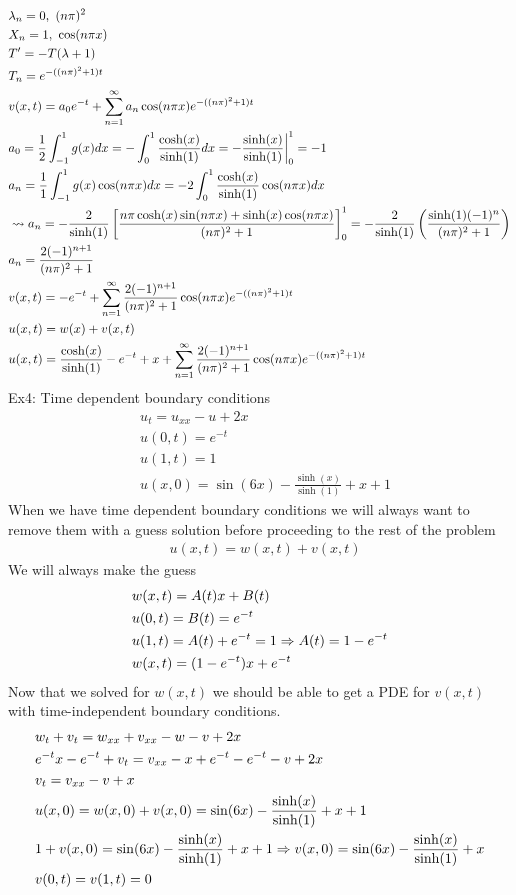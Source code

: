 \documentclass[11pt, fleqn]{article}
\begin{document}
\begin{align*}
    &\lambda_n=0,\ (n\pi)^2\\
    &X_n=1,\ \cos(n\pi x)\\
    &T'=-T(\lambda+1)\\
    &T_n=e^{-((n\pi)^2+1)t}\\
    &v(x,t)=a_0e^{-t}+\sum_{n=1}^\infty a_n\cos(n\pi x)e^{-((n\pi)^2+1)t}\\
    &a_0=\frac{1}{2}\int_{-1}^1g(x)dx=-\int_0^1\frac{\cosh(x)}{\sinh(1)}dx=-{\frac{\sinh(x)}{\sinh(1)}}\bigg\vert_0^1=-1\\
    &a_n=\frac{1}{1}\int_{-1}^1g(x)\cos(n\pi x)dx=-2\int_0^1\frac{\cosh(x)}{\sinh(1)}\cos(n\pi x)dx\\
    &\leadsto a_n=-\frac{2}{\sinh(1)}\left[ \frac{n\pi\cosh(x)\sin(n\pi x)+\sinh(x)\cos(n\pi x)}{(n\pi)^2+1} \right]_0^1=-\frac{2}{\sinh(1)}\left( \frac{\sinh(1)(-1)^n}{(n\pi)^2+1} \right)\\
    &a_n=\frac{2(-1)^{n+1}}{(n\pi)^2+1}\\
    &v(x,t)=-e^{-t}+\sum_{n=1}^\infty\frac{2(-1)^{n+1}}{(n\pi)^2+1}\cos(n\pi x)e^{-((n\pi)^2+1)t}\\
    &u(x,t)=w(x)+v(x,t)\\
    &u(x,t)=\frac{\cosh(x)}{\sinh(1)}-e^{-t}+x+\sum_{n=1}^\infty\frac{2(-1)^{n+1}}{(n\pi)^2+1}\cos(n\pi x)e^{-((n\pi)^2+1)t}
\end{align*}
Ex4: Time dependent boundary conditions
\begin{align*}
    &u_t=u_{xx}-u+2x\\
    &u(0,t)=e^{-t}\\
    &u(1,t)=1\\
    &u(x,0)=\sin(6x)-\frac{\sinh(x)}{\sinh(1)}+x+1
\end{align*}
When we have time dependent boundary conditions we will always want to remove them with a guess solution before proceeding to the rest of the problem
\begin{align*}
    &u(x,t)=w(x,t)+v(x,t)
\end{align*}
We will always make the guess
\begin{align*}
    &w(x,t)=A(t)x+B(t)\\
    &u(0,t)=B(t)=e^{-t}\\
    &u(1,t)=A(t)+e^{-t}=1\Rightarrow A(t)=1-e^{-t}\\
    &w(x,t)=(1-e^{-t})x+e^{-t}\
\end{align*}
Now that we solved for $w(x,t)$ we should be able to get a PDE for $v(x,t)$ with time-independent boundary conditions.
\begin{align*}
    &w_t+v_t=w_{xx}+v_{xx}-w-v+2x\\
    &e^{-t}x-e^{-t}+v_t=v_{xx}-x+e^{-t}-e^{-t}-v+2x\\
    &v_t=v_{xx}-v+x\\
    &u(x,0)=w(x,0)+v(x,0)=\sin(6x)-\frac{\sinh(x)}{\sinh(1)}+x+1\\
    &1+v(x,0)=\sin(6x)-\frac{\sinh(x)}{\sinh(1)}+x+1\Rightarrow v(x,0)=\sin(6x)-\frac{\sinh(x)}{\sinh(1)}+x\\
    &v(0,t)=v(1,t)=0
\end{align*}
\end{document}
